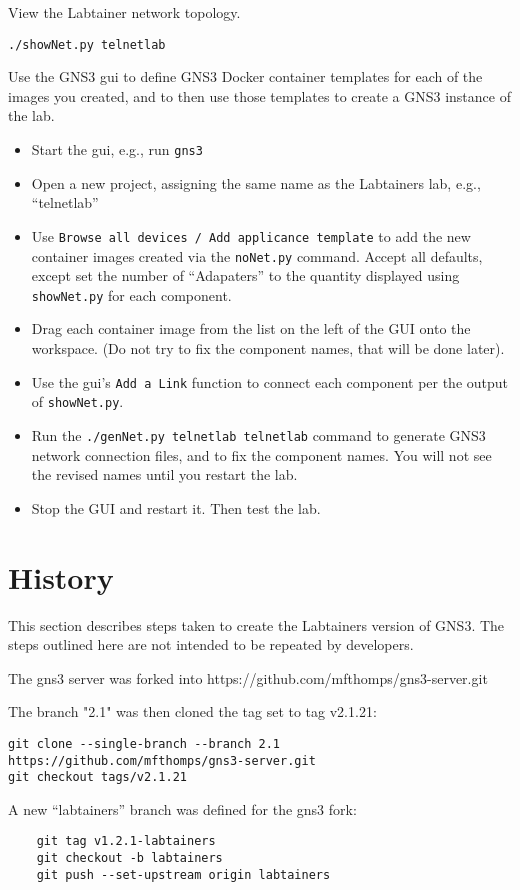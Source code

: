 \documentclass[12pt]{article}
\begin{document}
View the Labtainer network topology.
\begin{verbatim}
./showNet.py telnetlab
\end{verbatim}
\noindent Use the GNS3 gui to define GNS3 Docker container templates for each of the 
images you created, and to then use those templates to create a GNS3 instance of 
the lab.
\begin{itemize}
	\item Start the gui, e.g., run {\tt gns3}
	\item Open a new project, assigning the same name as the Labtainers lab, e.g., ``telnetlab''
	\item Use {\tt Browse all devices / Add applicance template} to add the new container images created
		via the {\tt noNet.py} command.  Accept all defaults, except set the number of ``Adapaters'' to
		the quantity displayed using {\tt showNet.py} for each component.
	\item Drag each container image from the list on the left of the GUI onto the workspace.  (Do not try to fix
		the component names, that will be done later).
	\item Use the gui's {\tt Add a Link} function to connect each component per the output of {\tt showNet.py}.
	\item Run the {\tt ./genNet.py telnetlab telnetlab} command to generate GNS3 network connection files, and to
		fix the component names.  You will not see the revised names until you restart the lab.
	\item Stop the GUI and restart it.  Then test the lab.
\end{itemize}

\section{History}
This section describes steps taken to create the Labtainers version of GNS3.
The steps outlined here are not intended to be repeated by developers.

The gns3 server was forked into https://github.com/mfthomps/gns3-server.git

The branch "2.1" was then cloned the tag set to tag v2.1.21:
\begin{verbatim}
git clone --single-branch --branch 2.1 https://github.com/mfthomps/gns3-server.git
git checkout tags/v2.1.21
\end{verbatim}

\noindent A new ``labtainers'' branch was defined for the gns3 fork:
\begin{verbatim}
    git tag v1.2.1-labtainers
    git checkout -b labtainers
    git push --set-upstream origin labtainers
\end{verbatim}
\end{document}
